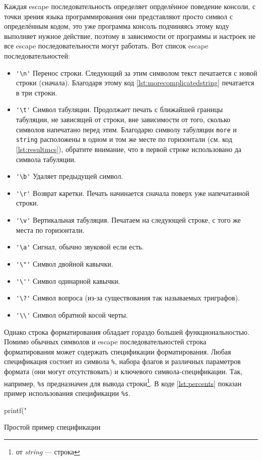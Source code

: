 \documentclass[12pt]{article}
\begin{document}
Каждая escape последовательность определяет опрделённое поведение консоли, с точки зрения языка программирования они представляют просто символ с определённым кодом, это уже программа консоль подчиняясь этому коду выполняет нужное действие, поэтому в зависимости от программы и настроек не все escape последовательности могут работать. Вот список escape последовательностей:
\begin{itemize}
 \item \verb|'\n'| Перенос строки. Следующий за этим символом текст печатается с новой строки (сначала). Благодаря этому код \ref{lst:morecomplicatedstring} печатается в три строки.
 \item \verb|'\t'| Символ табуляции. Продолжает печать с ближайшей границы табуляции, не зависящей от строки, вне зависимости от того, сколько символов напечатано перед этим. Благодарю символу табуляции \verb|more| и \verb|string| расположены в одном и том же месте по горизонтали (см. код \ref{lst:resultmcs}), обратите внимание, что в первой строке использовано да символа табуляции.
 \item \verb|'\b'| Удаляет предыдущей символ.
 \item \verb|'\r'| Возврат каретки. Печать начинается сначала поверх уже напечатанной строки.
 \item \verb|'\v'| Вертикальная табуляция. Печатаем на следующей строке, с того же места по горизонтали.
 \item \verb|'\a'| Сигнал, обычно звуковой если есть.
 \item \verb|'\"'| Символ двойной кавычки.
 \item \verb|'\''| Символ одинарной кавычки.
 \item \verb|'\?'| Символ вопроса (из-за существования так называемых триграфов).
 \item \verb|'\\'| Символ обратной косой черты.
\end{itemize}

Однако строка форматирования обладает гораздо большей функциональностью. Помимо обычных символов и escape последовательностей строка форматирования может содержать спецификации форматирования. Любая спецификация состоит из символа \verb|%|, набора флагов и различных параметров формата (они могут отсутствовать) и ключевого символа-спецификации. Так, например, \verb|%s| предназначен для вывода строки\footnote{от \textit{string} --- строка}. В коде \ref{lst:percents} показан пример использования спецификации \verb|%s|.
\begin{listing}[ht]
\begin{center}
\begin{ccode}
printf("%
\end{ccode}
\end{center}
\caption{Простой пример спецификации}
\label{lst:percents}
\end{listing}
\end{document}
